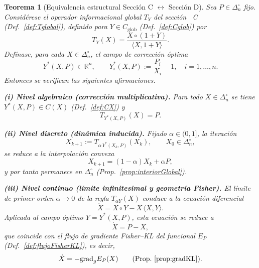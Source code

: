 ﻿\documentclass[12pt]{article}
\newtheorem{teorema}{Teorema}[section]
\begin{document}
\begin{teorema}[Equivalencia estructural Sección C $\leftrightarrow$ Sección D]
\label{teo:equivalenciaCD}
Sea $P\in\Delta_n^\circ$ fijo. Considérese el operador informacional global $T_Y$
del sección ~C (Def.~\ref{def:Tglobal}), definido para $Y\in C_{\mathrm{glob}}$
(Def.~\ref{def:Cglob}) por
\[
T_Y(X)=\frac{X\circ(1+Y)}{\langle X,1+Y\rangle}.
\]
Defínase, para cada $X\in\Delta_n^\circ$, el campo de corrección óptima
\[
Y^*(X,P)\in\mathbb{R}^n,
\qquad
Y^*_i(X,P):=\frac{P_i}{X_i}-1,\quad i=1,\dots,n.
\]
Entonces se verifican las siguientes afirmaciones.

\smallskip
\noindent\textbf{(i) Nivel algebraico (corrección multiplicativa).}
Para todo $X\in\Delta_n^\circ$ se tiene $Y^*(X,P)\in C(X)$ (Def.~\ref{def:CX}) y
\[
T_{Y^*(X,P)}(X)=P.
\]

\smallskip
\noindent\textbf{(ii) Nivel discreto (dinámica inducida).}
Fijado $\alpha\in(0,1]$, la iteración
\[
X_{k+1}:=T_{\alpha\,Y^*(X_k,P)}(X_k),\qquad X_0\in\Delta_n^\circ,
\]
se reduce a la interpolación convexa
\[
X_{k+1}=(1-\alpha)X_k+\alpha P,
\]
y por tanto permanece en $\Delta_n^\circ$ (Prop.~\ref{prop:interiorGlobal}).

\smallskip
\noindent\textbf{(iii) Nivel continuo (límite infinitesimal y geometría Fisher).}
El límite de primer orden $\alpha\to 0$ de la regla
$T_{\alpha Y}(X)$ conduce a la ecuación diferencial
\[
\dot X = X\circ Y - X\,\langle X,Y\rangle.
\]
Aplicada al campo óptimo $Y=Y^*(X,P)$, esta ecuación se reduce a
\[
\dot X = P-X,
\]
que coincide con el flujo de gradiente Fisher--KL del funcional $E_P$
(Def.~\ref{def:flujoFisherKL}), es decir,
\[
\dot X=-\mathrm{grad}_g E_P(X)
\qquad
(\text{Prop.~\ref{prop:gradKL}}).
\]

\end{teorema}
\end{document}
